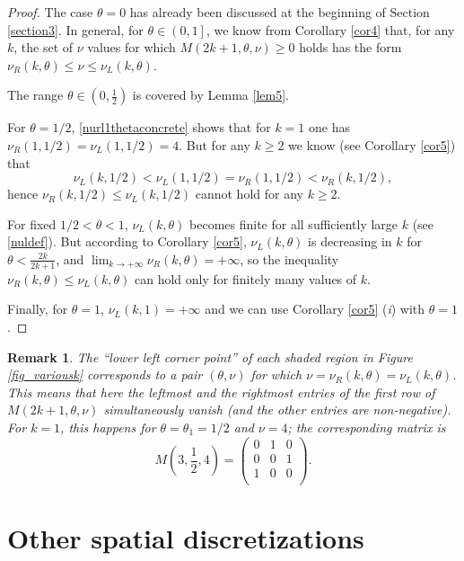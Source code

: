 \documentclass[a4paper]{article}
\newtheorem{remark}{Remark}
\newcommand{\te}{\theta}
\newcommand{\nul}{\nu_L(k,\theta)}
\newcommand{\nur}{\nu_R(k,\theta)}
\begin{document}
\begin{proof} The case $\te=0$ has already been discussed at the beginning of Section \ref{section3}.
In general, for $\te\in\left(0,1\right]$, we know from Corollary \ref{cor4} that, for any $k$, the set of $\nu$ values for which $M(2k+1,\te,\nu)\ge 0$ holds has the form $\nur\le\nu\le\nul$. 

The range $\te\in\left(0,\frac{1}{2}\right)$ is covered by Lemma \ref{lem5}. 

For $\te=1/2$, \eqref{nurl1thetaconcrete} shows that for $k=1$ one has $\nu_R(1,1/2)=\nu_L(1,1/2)=4$. 
But for any $k\ge 2$ we know (see Corollary \ref{cor5}) that
\[
\nu_L(k,1/2)<\nu_L(1,1/2)=\nu_R(1,1/2)<\nu_R(k,1/2),
\]
hence $\nu_R(k,1/2)\le\nu_L(k,1/2)$ cannot hold for any $k\ge 2$.

For fixed $1/2<\te<1$, $\nul$ becomes finite for all sufficiently large $k$ (see \eqref{nuldef}). But according to Corollary \ref{cor5}, $\nul$ is decreasing in $k$ for $\te<\frac{2k}{2k+1}$, and 
$\lim_{k\to+\infty} \nur=+\infty$, so the inequality $\nur\le\nul$ can hold only for finitely many values of $k$.

Finally, for $\te=1$, $\nu_L(k,1)=+\infty$ and we can use Corollary \ref{cor5} (\textit{i}) with $\te=1$.
\end{proof}

\begin{remark}
The ``lower left corner point'' of each shaded region in Figure \ref{fig_variousk} corresponds to a pair 
$(\te,\nu)$  for which $\nu=\nur=\nul$. This means that here the leftmost and the rightmost entries of the first row of $M(2k+1,\te,\nu)$ simultaneously vanish (and the other entries are non-negative). For $k=1$, this happens for $\te=\te_1=1/2$ and $\nu=4$; the corresponding matrix is
\begin{equation}\label{rem10thetahalfmatrix}
M\left(3,\frac{1}{2},4\right)=\left(
\begin{array}{ccc}
 0 & 1 & 0 \\
 0 & 0 & 1 \\
 1 & 0 & 0 \\
\end{array}
\right).
\end{equation}
\end{remark}






\section{Other spatial discretizations}\label{otherdisc}
\end{document}
